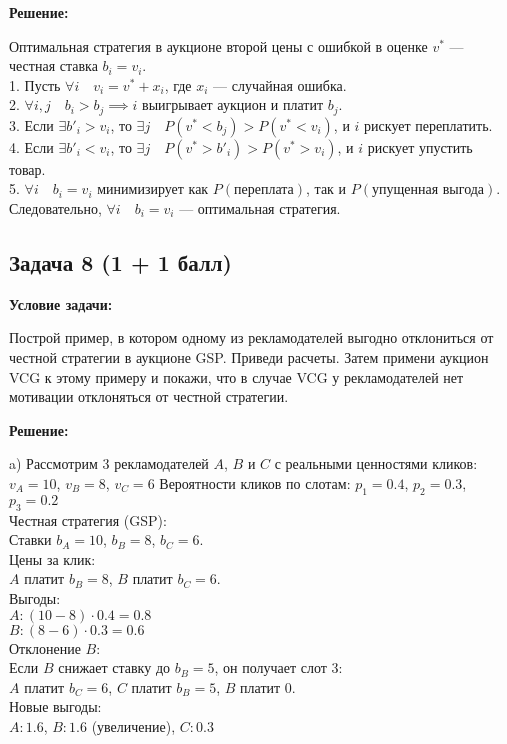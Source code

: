 \documentclass[a4paper,12pt]{article}
\begin{document}
\textbf{Решение:}

Оптимальная стратегия в аукционе второй цены с ошибкой в оценке \( v^* \) — честная ставка \( b_i = v_i \).\\
1. Пусть \( \forall i \quad v_i = v^* + x_i \), где \( x_i \) — случайная ошибка.\\
2. \( \forall i, j \quad b_i > b_j \implies i \) выигрывает аукцион и платит \( b_j \).\\
3. Если \( \exists b'_i > v_i \), то \( \exists j \quad P(v^* < b_j) > P(v^* < v_i) \), и \( i \) рискует переплатить.\\
4. Если \( \exists b'_i < v_i \), то \( \exists j \quad P(v^* > b'_i) > P(v^* > v_i) \), и \( i \) рискует упустить товар.\\
5. \( \forall i \quad b_i = v_i \) минимизирует как \( P(\text{переплата}) \), так и \( P(\text{упущенная выгода}) \).\\

Следовательно, \( \forall i \quad b_i = v_i \) — оптимальная стратегия.
\vspace{1cm}

\subsection{Задача 8 (1 + 1 балл)}
\textbf{Условие задачи:}

Построй пример, в котором одному из рекламодателей выгодно отклониться от честной стратегии в аукционе GSP. Приведи расчеты. Затем примени аукцион VCG к этому примеру и покажи, что в случае VCG у рекламодателей нет мотивации отклоняться от честной стратегии.

\textbf{Решение:}

\item[a)] Рассмотрим 3 рекламодателей \(A\), \(B\) и \(C\) с реальными ценностями кликов:
\(v_A = 10\), \(v_B = 8\), \(v_C = 6\)
Вероятности кликов по слотам:
\(p_1 = 0.4\), \(p_2 = 0.3\), \(p_3 = 0.2\)\\
Честная стратегия (GSP):\\
Ставки \(b_A = 10\), \(b_B = 8\), \(b_C = 6\).\\
Цены за клик:\\
\(A\) платит \(b_B = 8\), \(B\) платит \(b_C = 6\).\\
Выгоды:\\
\(A: (10-8)\cdot 0.4 = 0.8\)\\
\(B: (8-6)\cdot 0.3 = 0.6\)\\
Отклонение \(B\):\\
Если \(B\) снижает ставку до \(b_B = 5\), он получает слот 3:\\
\(A\) платит \(b_C = 6\), \(C\) платит \(b_B = 5\), \(B\) платит 0.\\
Новые выгоды:\\
\(A: 1.6\), \(B: 1.6\) (увеличение), \(C: 0.3\)\\
\end{document}
